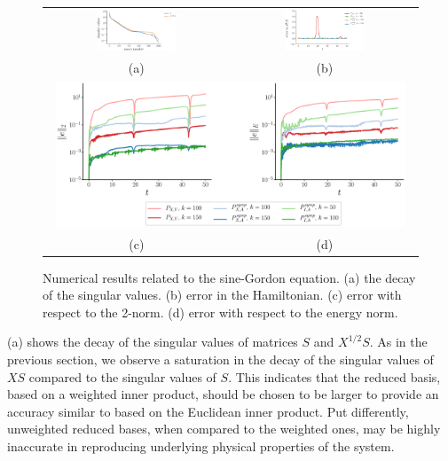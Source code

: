 \begin{figure} \label{fig:2}
\begin{tabular}{cc}
\includegraphics[width=0.45\textwidth]{./figs/sine/singulars} & \includegraphics[width=0.45\textwidth]{./figs/sine/energy} \\
(a) & (b) \\
\multicolumn{2}{c}{
\includegraphics[width=0.96\textwidth]{./figs/sine/error_combined} }\\
(c) & (d) \\
\end{tabular}
\caption{Numerical results related to the sine-Gordon equation. (a) the decay of the singular values. (b) error in the Hamiltonian. (c) error with respect to the 2-norm. (d) error with respect to the energy norm.}
\end{figure}

(a) shows the decay of the singular values of matrices $S$ and $X^{1/2}S$. As in the previous section, we observe a saturation in the decay of the singular values of $XS$ compared to the singular values of $S$. This indicates that the reduced basis, based on a weighted inner product, should be chosen to be larger to provide an accuracy similar to based on the Euclidean inner product. Put differently, unweighted reduced bases, when compared to the weighted ones, may be highly inaccurate in reproducing underlying physical properties of the system.

